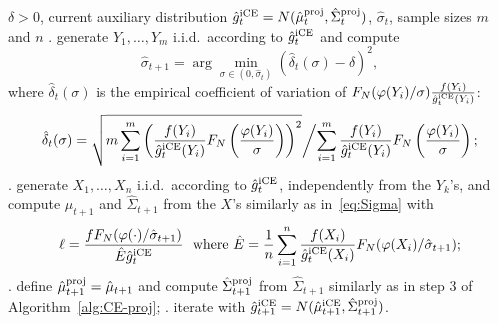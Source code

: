 \documentclass[]{article}
\newcommand{\npar}{{n}}
\newcommand{\proj}{{\textnormal{\textrm{proj}}}} %
\newcommand{\iCE}{{\textnormal{\textrm{iCE}}}} %
\theoremstyle{plain}
\theoremstyle{definition}
\begin{document}
% 
\begin{algorithm}[t]
\caption{One iteration of improved CE (iCE) with projection}\label{alg:iCE-proj}
\begin{algorithmic}
\Require $\delta > 0$, current auxiliary distribution $\hat g^\iCE_t = N(\hat \mu^\proj_t, \hat \Sigma^\proj_t)$, $\hat \sigma_t$, sample sizes $m$ and $\npar$
. generate $Y_1, \ldots, Y_m$ i.i.d.\ according to $\hat g^\iCE_t$ and compute
\[ \hat \sigma_{t+1} = \arg \min_{\sigma \in (0, \hat \sigma_t)} (\hat \delta_t(\sigma) - \delta )^2, \]
where $\hat \delta_t(\sigma)$ is the empirical coefficient of variation of $F_N(\varphi(Y_i)/\sigma) \frac{f(Y_i)}{\hat g^\iCE_t(Y_i)}$:
\begin{equation}\label{eq:iCE-delta}
    \hat \delta_t(\sigma) = \sqrt{ m \sum_{i=1}^m \left( \frac{f(Y_i)}{\hat g^\iCE_t(Y_i)} F_N\left( \frac{\varphi(Y_i)}{\sigma} \right) \right)^2} \biggl/ \sum_{i=1}^m \frac{f(Y_i)}{\hat g^\iCE_t(Y_i)} F_N \left( \frac{\varphi(Y_i)}{\sigma} \right);
\end{equation}
. generate $X_1, \ldots, X_\npar$ i.i.d.\ according to $\hat g^\iCE_t$, independently from the $Y_k$'s, and compute $\hat \mu_{t+1}$ and $\hat \Sigma_{t+1}$ from the $X$'s similarly as in~\eqref{eq:Sigma} with
\[ \ell = \frac{f F_N(\varphi(\cdot)/\hat \sigma_{t+1})}{\hat E \hat g^\iCE_t} \ \text{ where } \hat E = \frac{1}{\npar} \sum_{i=1}^\npar \frac{f(X_i)}{\hat g^\iCE_t(X_i)} F_N(\varphi(X_i) / \hat \sigma_{t+1}); \]
. define $\hat \mu^\proj_{t+1} = \hat \mu_{t+1}$ and compute $ \hat \Sigma^\proj_{t+1}$ from $\hat \Sigma_{t+1}$ similarly as in step 3 of Algorithm~\ref{alg:CE-proj};
. iterate with $\hat g^\iCE_{t+1} = N(\hat \mu^\iCE_{t+1}, \hat \Sigma^\proj_{t+1})$.
\end{algorithmic}
\end{algorithm}
% 
\end{document}
